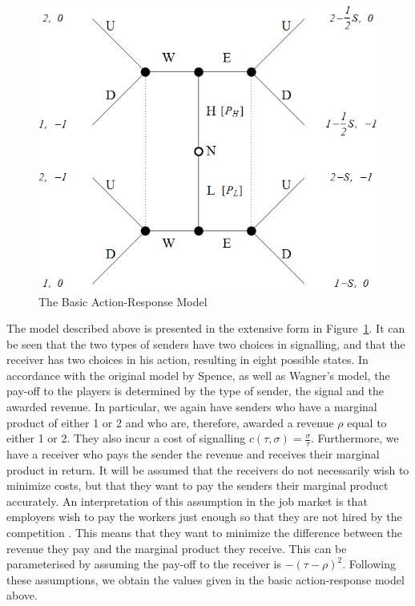 \documentclass[a4paper,10pt]{article}
\numberwithin{equation}{section}
\begin{document}
\begin{figure}[h]
\begin{center}
\leavevmode
\includegraphics[scale=.4]{Graph2.png}
\end{center}
\caption{The Basic Action-Response Model}
\label{fig:Graph2.png}
\end{figure}

The model described above is presented in the extensive form in Figure~\ref{fig:Graph2.png}. It can be seen that the two types of senders have two choices in signalling, and that the receiver has two choices in his action, resulting in eight possible states. In accordance with the original model by Spence, as well as Wagner's model, the pay-off to the players is determined by the type of sender, the signal and the awarded revenue. In particular, we again have senders who have a marginal product of either 1 or 2 and who are, therefore, awarded a revenue $\rho$ equal to either 1 or 2. They also incur a cost of signalling $c(\tau,\sigma)=\frac{\sigma}{\tau}$. Furthermore, we have a receiver who pays the sender the revenue and receives their marginal product in return. It will be assumed that the receivers do not necessarily wish to minimize costs, but that they want to pay the senders their marginal product accurately. An interpretation of this assumption in the job market is that employers wish to pay the workers just enough so that they are not hired by the competition \cite{Gibbons1992}. This means that they want to minimize the difference between the revenue they pay and the marginal product they receive. This can be parameterised by assuming the pay-off to the receiver is $-{(\tau-\rho)}^2$. Following these assumptions, we obtain the values given in the basic action-response model above.
\end{document}
